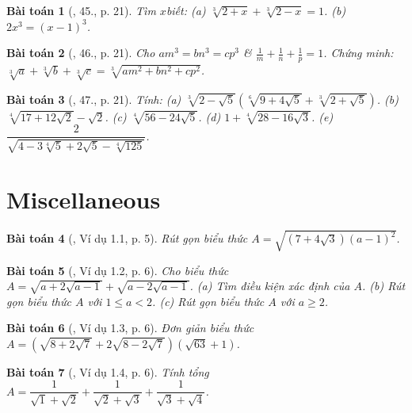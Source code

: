 \documentclass{article}
\newtheorem{baitoan}{Bài toán}
\begin{document}
\begin{baitoan}[\cite{Binh_Toan_9_tap_1}, 45., p. 21]
	Tìm $x$biết: (a) $\sqrt[3]{2 + x} + \sqrt[3]{2 - x} = 1$. (b) $2x^3 = (x - 1)^3$.
\end{baitoan}

\begin{baitoan}[\cite{Binh_Toan_9_tap_1}, 46., p. 21]
	Cho $am^3 = bn^3 = cp^3$ \& $\frac{1}{m} + \frac{1}{n} + \frac{1}{p} = 1$. Chứng minh: $\sqrt[3]{a} + \sqrt[3]{b} + \sqrt[3]{c} = \sqrt[3]{am^2 + bn^2 + cp^2}$.
\end{baitoan}

\begin{baitoan}[\cite{Binh_Toan_9_tap_1}, 47., p. 21]
	 Tính: (a) $\sqrt[3]{2 - \sqrt{5}}(\sqrt[6]{9 + 4\sqrt{5}} + \sqrt[3]{2 + \sqrt{5}})$. (b) $\sqrt[4]{17 + 12\sqrt{2}} - \sqrt{2}$. (c) $\sqrt[4]{56 - 24\sqrt{5}}$. (d) $1 + \sqrt[4]{28 - 16\sqrt{3}}$. (e) $\dfrac{2}{\sqrt{4 - 3\sqrt[4]{5} + 2\sqrt{5} - \sqrt[4]{125}}}$.
\end{baitoan}


\section{Miscellaneous}

\begin{baitoan}[\cite{TLCT_THCS_Toan_9_dai_so}, Ví dụ 1.1, p. 5]
	Rút gọn biểu thức $A = \sqrt{(7 + 4\sqrt{3})(a - 1)^2}$.
\end{baitoan}

\begin{baitoan}[\cite{TLCT_THCS_Toan_9_dai_so}, Ví dụ 1.2, p. 6]
	Cho biểu thức $A = \sqrt{a + 2\sqrt{a - 1}} + \sqrt{a - 2\sqrt{a - 1}}$. (a) Tìm điều kiện xác định của $A$. (b) Rút gọn biểu thức $A$ với $1\le a < 2$. (c) Rút gọn biểu thức $A$ với $a\ge2$.
\end{baitoan}

\begin{baitoan}[\cite{TLCT_THCS_Toan_9_dai_so}, Ví dụ 1.3, p. 6]
	Đơn giản biểu thức $A = \left(\sqrt{8 + 2\sqrt{7}} + 2\sqrt{8 - 2\sqrt{7}}\right)(\sqrt{63} + 1)$.
\end{baitoan}

\begin{baitoan}[\cite{TLCT_THCS_Toan_9_dai_so}, Ví dụ 1.4, p. 6]
	Tính tổng $A = \dfrac{1}{\sqrt{1} + \sqrt{2}} + \dfrac{1}{\sqrt{2} + \sqrt{3}} + \dfrac{1}{\sqrt{3} + \sqrt{4}}$.
\end{baitoan}
\end{document}

